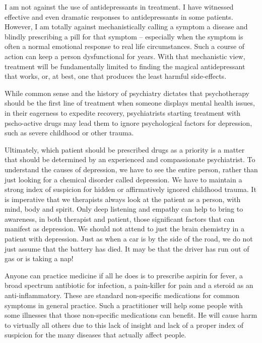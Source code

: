 \documentclass[]{book}
\begin{document}
I am not against the use of antidepressants in treatment. I have witnessed effective and even dramatic responses to antidepressants in some patients. However, I am totally against mechanistically calling a symptom a disease and blindly prescribing a pill for that symptom -- especially when the symptom is often a normal emotional response to real life circumstances. Such a course of action can keep a person dysfunctional for years. With that mechanistic view, treatment will be fundamentally limited to finding the magical antidepressant that works, or, at best, one that produces the least harmful side-effects.

While common sense and the history of psychiatry dictates that psychotherapy should be the first line of treatment when someone displays mental health issues, in their eagerness to expedite recovery, psychiatrists starting treatment with pscho-active drugs may lead them to ignore psychological factors for depression, such as severe childhood or other trauma.

Ultimately, which patient should be prescribed drugs as a priority is a matter that should be determined by an experienced and compassionate psychiatrist. To understand the causes of depression, we have to see the entire person, rather than just looking for a chemical disorder called depression. We have to maintain a strong index of suspicion for hidden or affirmatively ignored childhood trauma. It is imperative that we therapists always look at the patient as a person, with mind, body and spirit. Only deep listening and empathy can help to bring to awareness, in both therapist and patient, those significant factors that can manifest as depression. We should not attend to just the brain chemistry in a patient with depression. Just as when a car is by the side of the road, we do not just assume that the battery has died. It may be that the driver has run out of gas or is taking a nap!

Anyone can practice medicine if all he does is to prescribe aspirin for fever, a broad spectrum antibiotic for infection, a pain-killer for pain and a steroid as an anti-inflammatory. These are standard non-specific medications for common symptoms in general practice. Such a practitioner will help some people with some illnesses that those non-specific medications can benefit. He will cause harm to virtually all others due to this lack of insight and lack of a proper index of suspicion for the many diseases that actually affect people.
\end{document}
